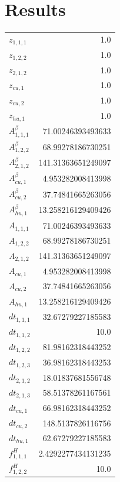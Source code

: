 \documentclass{article}%
\makeatletter
\let\mcnewpage=\newpage%
\newcommand{\TrickSupertabularIntoMulticols}{%
\renewcommand\newpage{%
\if@firstcolumn%
\hrule width\linewidth height0pt%
\columnbreak%
\else%
\mcnewpage%
\fi%
}%
}%
\makeatother
\begin{document}
\section{Results}%
\thispagestyle{plain}%
\begin{multicols*}{3}%
\TrickSupertabularIntoMulticols%
%
\begin{supertabular}{lr}%
	$z_{1,1,1}$ & 1.0 \\%
	$z_{1,2,2}$ & 1.0 \\%
	$z_{2,1,2}$ & 1.0 \\%
	$z_{cu,1}$ & 1.0 \\%
	$z_{cu,2}$ & 1.0 \\%
	$z_{hu,1}$ & 1.0 \\%
	$A_{1,1,1}^{\beta}$ & 71.00246393493633 \\%
	$A_{1,2,2}^{\beta}$ & 68.99278186730251 \\%
	$A_{2,1,2}^{\beta}$ & 141.31363651249097 \\%
	$A_{cu,1}^{\beta}$ & 4.953282008413998 \\%
	$A_{cu,2}^{\beta}$ & 37.74841665263056 \\%
	$A_{hu,1}^{\beta}$ & 13.258216129409426 \\%
	$A_{1,1,1}$ & 71.00246393493633 \\%
	$A_{1,2,2}$ & 68.99278186730251 \\%
	$A_{2,1,2}$ & 141.31363651249097 \\%
	$A_{cu,1}$ & 4.953282008413998 \\%
	$A_{cu,2}$ & 37.74841665263056 \\%
	$A_{hu,1}$ & 13.258216129409426 \\%
	$dt_{1,1,1}$ & 32.67279227185583 \\%
	$dt_{1,1,2}$ & 10.0 \\%
	$dt_{1,2,2}$ & 81.98162318443252 \\%
	$dt_{1,2,3}$ & 36.98162318443253 \\%
	$dt_{2,1,2}$ & 18.01837681556748 \\%
	$dt_{2,1,3}$ & 58.51378261167561 \\%
	$dt_{cu,1}$ & 66.98162318443252 \\%
	$dt_{cu,2}$ & 148.5137826116756 \\%
	$dt_{hu,1}$ & 62.67279227185583 \\%
	$f_{1,1,1}^{H}$ & 2.4292277434131235 \\%
	$f_{1,2,2}^{H}$ & 10.0 \\%

\end{supertabular}
\end{multicols*}
\end{document}
